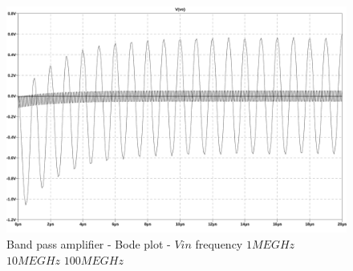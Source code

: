 \documentclass[10pt,a4paper]{article}
\begin{document}
\begin{figure}[H]
  \centering
  \includegraphics[width=14cm]{graph/2d4c.jpg}
  \caption{Band pass amplifier - Bode plot - $Vin$ frequency $1MEGHz$ $10MEGHz$ $100MEGHz$}
  \label{2d4cgraph}
\end{figure}
\end{document}
